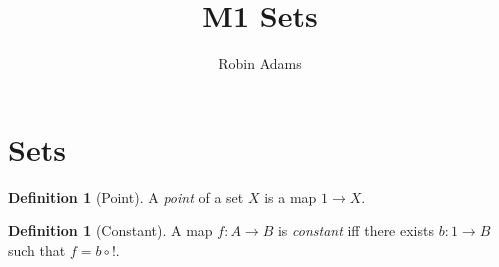 \documentclass{article}
\title{M1 Sets}
\author{Robin Adams}
\theoremstyle{definition}
\newtheorem{definition}[axiom]{Definition}
\begin{document}
\maketitle
\tableofcontents

\section{Sets}

\begin{definition}[Point]
    A \emph{point} of a set $X$ is a map $1 \rightarrow X$.
\end{definition}

\begin{definition}[Constant]
    A map $f : A \rightarrow B$ is \emph{constant} iff there exists $b : 1 \rightarrow B$ such that $f = b \circ !$.
\end{definition}
\end{document}
